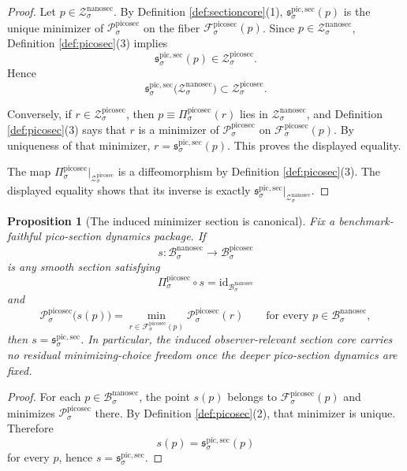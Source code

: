 \documentclass[11pt]{article}
\newcommand{\NanoSectionBody}[1]{\mathcal B_{#1}^{\mathrm{nanosec}}}
\newcommand{\NanoSectionShell}[1]{\mathcal Z_{#1}^{\mathrm{nanosec}}}
\newcommand{\PicoSectionBody}[1]{\mathcal B_{#1}^{\mathrm{picosec}}}
\newcommand{\PicoSectionProj}[1]{\Pi_{#1}^{\mathrm{picosec}}}
\newcommand{\PicoSectionFiber}[2]{\mathcal F_{#1}^{\mathrm{picosec}}(#2)}
\newcommand{\PicoSectionFunctional}[1]{\mathscr P_{#1}^{\mathrm{picosec}}}
\newcommand{\PicoSectionShell}[1]{\mathcal Z_{#1}^{\mathrm{picosec}}}
\newcommand{\PicoMinSection}[1]{\mathfrak s_{#1}^{\mathrm{pic,sec}}}
\newtheorem{proposition}{Proposition}
\begin{document}
\begin{proof}
Let \(p\in\NanoSectionShell{\sigma}\). By Definition \ref{def:sectioncore}(1), \(\PicoMinSection{\sigma}(p)\) is the unique minimizer of \(\PicoSectionFunctional{\sigma}\) on the fiber \(\PicoSectionFiber{\sigma}{p}\). Since \(p\in\NanoSectionShell{\sigma}\), Definition \ref{def:picosec}(3) implies
\[
\PicoMinSection{\sigma}(p)\in\PicoSectionShell{\sigma}.
\]
Hence
\[
\PicoMinSection{\sigma}\bigl(\NanoSectionShell{\sigma}\bigr)\subset\PicoSectionShell{\sigma}.
\]

Conversely, if \(r\in\PicoSectionShell{\sigma}\), then \(p\equiv\PicoSectionProj{\sigma}(r)\) lies in \(\NanoSectionShell{\sigma}\), and Definition \ref{def:picosec}(3) says that \(r\) is a minimizer of \(\PicoSectionFunctional{\sigma}\) on \(\PicoSectionFiber{\sigma}{p}\). By uniqueness of that minimizer, \(r=\PicoMinSection{\sigma}(p)\). This proves the displayed equality.

The map \(\PicoSectionProj{\sigma}\big|_{\PicoSectionShell{\sigma}}\) is a diffeomorphism by Definition \ref{def:picosec}(3). The displayed equality shows that its inverse is exactly \(\PicoMinSection{\sigma}\big|_{\NanoSectionShell{\sigma}}\).
\end{proof}

\begin{proposition}[The induced minimizer section is canonical]
\label{prop:canonical}
Fix a benchmark-faithful pico-section dynamics package. If
\[
s:\NanoSectionBody{\sigma}\to\PicoSectionBody{\sigma}
\]
is any smooth section satisfying
\[
\PicoSectionProj{\sigma}\circ s
=
\mathrm{id}_{\NanoSectionBody{\sigma}}
\]
and
\[
\PicoSectionFunctional{\sigma}\bigl(s(p)\bigr)
=
\min_{r\in\PicoSectionFiber{\sigma}{p}}
\PicoSectionFunctional{\sigma}(r)
\qquad
\text{for every }
p\in\NanoSectionBody{\sigma},
\]
then \(s=\PicoMinSection{\sigma}\). In particular, the induced observer-relevant section core carries no residual minimizing-choice freedom once the deeper pico-section dynamics are fixed.
\end{proposition}

\begin{proof}
For each \(p\in\NanoSectionBody{\sigma}\), the point \(s(p)\) belongs to \(\PicoSectionFiber{\sigma}{p}\) and minimizes \(\PicoSectionFunctional{\sigma}\) there. By Definition \ref{def:picosec}(2), that minimizer is unique. Therefore
\[
s(p)=\PicoMinSection{\sigma}(p)
\]
for every \(p\), hence \(s=\PicoMinSection{\sigma}\).
\end{proof}
\end{document}
